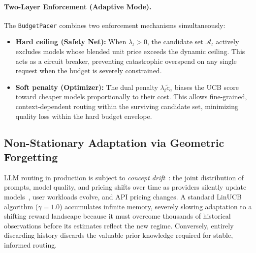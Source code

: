 \paragraph{Two-Layer Enforcement (Adaptive Mode).}
The \texttt{BudgetPacer} combines two enforcement mechanisms simultaneously:
\begin{itemize}[nosep,leftmargin=*]
  \item \textbf{Hard ceiling (Safety Net):} When $\lambda_t > 0$, the candidate set $\mathcal{A}_t$ actively excludes models whose blended unit price exceeds the dynamic ceiling. This acts as a circuit breaker, preventing catastrophic overspend on any single request when the budget is severely constrained.
  \item \textbf{Soft penalty (Optimizer):} The dual penalty $\lambda_t\tilde{c}_a$ biases the UCB score toward cheaper models proportionally to their cost. This allows fine-grained, context-dependent routing within the surviving candidate set, minimizing quality loss within the hard budget envelope.
\end{itemize}

\subsection{Non-Stationary Adaptation via Geometric Forgetting}
\label{sec:forgetting}

LLM routing in production is subject to \emph{concept drift}~\cite{gama2014survey}: the joint distribution of prompts, model quality, and pricing shifts over time as providers silently update models~\cite{chen2023chatgptdrift,chen2025silent}, user workloads evolve, and API pricing changes.
A standard LinUCB algorithm ($\gamma=1.0$) accumulates infinite memory, severely slowing adaptation to a shifting reward landscape because it must overcome thousands of historical observations before its estimates reflect the new regime. Conversely, entirely discarding history discards the valuable prior knowledge required for stable, informed routing.

